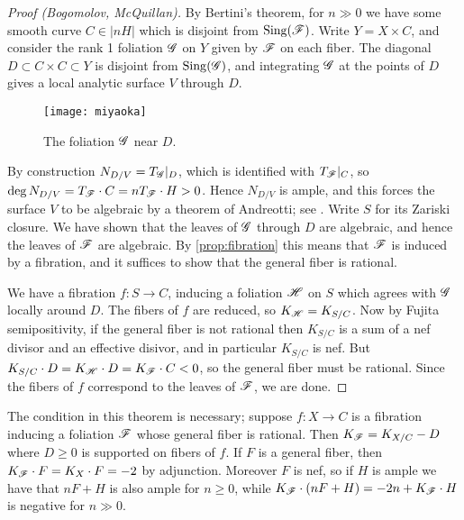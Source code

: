 \begin{proof}[Proof (Bogomolov, McQuillan)]
    By Bertini's theorem, for $n\gg0$ we have some smooth curve $C\in|nH|$ which
    is disjoint from $\operatorname{Sing}(\mathscr{F})$. Write $Y=X\times C$, and consider the rank
    1 foliation $\mathscr{G}$ on $Y$ given by $\mathscr{F}$ on each fiber. The diagonal
    $D\subset C\times C\subset Y$ is disjoint from $\operatorname{Sing}(\mathscr{G})$, and
    integrating $\mathscr{G}$ at the points of $D$ gives a local analytic surface $V$
    through $D$.
    \begin{figure}[H]
        \centering
        \texttt{[image: miyaoka]}
        \caption{The foliation $\mathscr{G}$ near $D$.}
    \end{figure}
    By construction $N_{D/V}=T_{\mathscr{G}}|_D$, which is identified with $T_{\mathscr{F}}|_C$,
    so $\deg N_{D/V}=T_{\mathscr{F}}\cdot C=nT_{\mathscr{F}}\cdot H>0$. Hence $N_{D/V}$ is
    ample, and this forces the surface $V$ to be algebraic by a theorem of
    Andreotti; see \cite[Thm 3.4]{bost_13}. Write $S$ for its Zariski closure.
    We have shown that the leaves of $\mathscr{G}$ through $D$ are algebraic, and
    hence the leaves of $\mathscr{F}$ are algebraic. By \cref{prop:fibration} this
    means that $\mathscr{F}$ is induced by a fibration, and it suffices to show that
    the general fiber is rational.

    We have a fibration $f:S\to C$, inducing a foliation $\mathscr{H}$ on $S$ which
    agrees with $\mathscr{G}$ locally around $D$. The fibers of $f$ are reduced, so
    $K_{\mathscr{H}}=K_{S/C}$. Now by Fujita semipositivity, if the general fiber is not
    rational then $K_{S/C}$ is a sum of a nef divisor and an effective disivor,
    and in particular $K_{S/C}$ is nef. But
    $K_{S/C}\cdot D=K_{\mathscr{H}}\cdot D=K_{\mathscr{F}}\cdot C<0$, so the general fiber must
    be rational. Since the fibers of $f$ correspond to the leaves of $\mathscr{F}$, we
    are done.
\end{proof}

\begin{remark}
    The condition in this theorem is necessary; suppose $f:X\to C$ is a
    fibration inducing a foliation $\mathscr{F}$ whose general fiber is rational. Then
    $K_{\mathscr{F}}=K_{X/C}-D$ where $D\ge0$ is supported on fibers of $f$. If $F$ is a
    general fiber, then $K_{\mathscr{F}}\cdot F=K_X\cdot F=-2$ by adjunction. Moreover
    $F$ is nef, so if $H$ is ample we have that $nF+H$ is also ample for
    $n\ge0$, while $K_{\mathscr{F}}\cdot(nF+H)=-2n+K_{\mathscr{F}}\cdot H$ is negative for
    $n\gg0$.
\end{remark}
